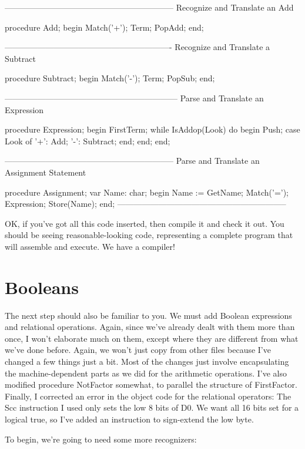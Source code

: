 \documentclass[float=false, crop=false]{standalone}
\begin{document}
\begin{code}
{--------------------------------------------------------------}
{ Recognize and Translate an Add }

procedure Add;
begin
   Match('+');
   Term;
   PopAdd;
end;


{-------------------------------------------------------------}
{ Recognize and Translate a Subtract }

procedure Subtract;
begin
   Match('-');
   Term;
   PopSub;
end;


{---------------------------------------------------------------}
{ Parse and Translate an Expression }

procedure Expression;
begin
   FirstTerm;
   while IsAddop(Look) do begin
      Push;
      case Look of
       '+': Add;
       '-': Subtract;
      end;
   end;
end;


{--------------------------------------------------------------}
{ Parse and Translate an Assignment Statement }

procedure Assignment;
var Name: char;
begin
   Name := GetName;
   Match('=');
   Expression;
   Store(Name);
end;
{--------------------------------------------------------------}
\end{code}

OK, if you've got all this code inserted, then compile it and check it out. You
should be seeing reasonable-looking code, representing a complete program that
will assemble and execute. We have a compiler!


\section{Booleans}

The next step should also be familiar to you. We must add Boolean expressions
and relational operations. Again, since we've already dealt with them more than
once, I won't elaborate much on them, except where they are different from what
we've done before. Again, we won't just copy from other files because I've
changed a few things just a bit. Most of the changes just involve encapsulating
the machine-dependent parts as we did for the arithmetic operations. I've also
modified procedure NotFactor somewhat, to parallel the structure of FirstFactor.
Finally, I corrected an error in the object code for the relational operators:
The Scc instruction I used only sets the low 8 bits of D0. We want all 16 bits
set for a logical true, so I've added an instruction to sign-extend the low
byte.

To begin, we're going to need some more recognizers:
\end{document}

